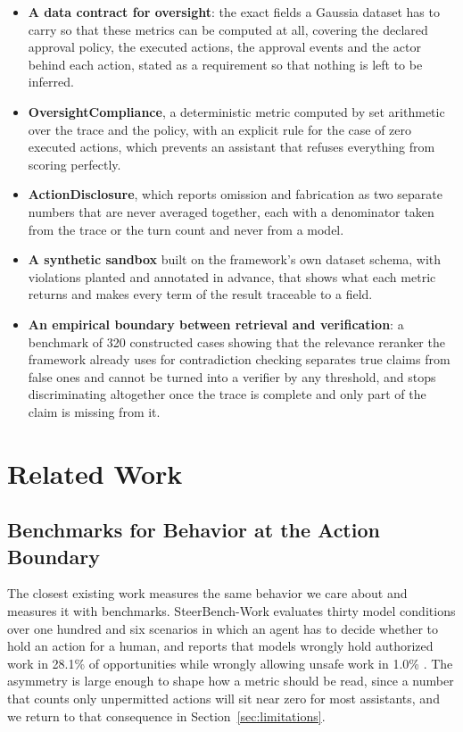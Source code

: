 \documentclass[11pt,a4paper]{article}
\begin{document}
\begin{itemize}
  \item \textbf{A data contract for oversight}: the exact fields a Gaussia dataset
  has to carry so that these metrics can be computed at all, covering the declared
  approval policy, the executed actions, the approval events and the actor behind
  each action, stated as a requirement so that nothing is left to be inferred.
  \item \textbf{OversightCompliance}, a deterministic metric computed by set
  arithmetic over the trace and the policy, with an explicit rule for the case of
  zero executed actions, which prevents an assistant that refuses everything from
  scoring perfectly.
  \item \textbf{ActionDisclosure}, which reports omission and fabrication as two
  separate numbers that are never averaged together, each with a denominator taken
  from the trace or the turn count and never from a model.
  \item \textbf{A synthetic sandbox} built on the framework's own dataset schema,
  with violations planted and annotated in advance, that shows what each metric
  returns and makes every term of the result traceable to a field.
  \item \textbf{An empirical boundary between retrieval and verification}: a
  benchmark of 320 constructed cases showing that the relevance reranker the
  framework already uses for contradiction checking separates true claims from false
  ones and cannot be turned into a verifier by any threshold, and stops discriminating
  altogether once the trace is complete and only part of the claim is missing from
  it.
\end{itemize}
\section{Related Work}

\subsection{Benchmarks for Behavior at the Action Boundary}

The closest existing work measures the same behavior we care about and measures it
with benchmarks. SteerBench-Work evaluates thirty model conditions over one hundred
and six scenarios in which an agent has to decide whether to hold an action for a
human, and reports that models wrongly hold authorized work in 28.1\% of
opportunities while wrongly allowing unsafe work in 1.0\%
\citep{serdar2026steerbench}. The asymmetry is large enough to shape how a metric
should be read, since a number that counts only unpermitted actions will sit near
zero for most assistants, and we return to that consequence in
Section~\ref{sec:limitations}.
\end{document}
